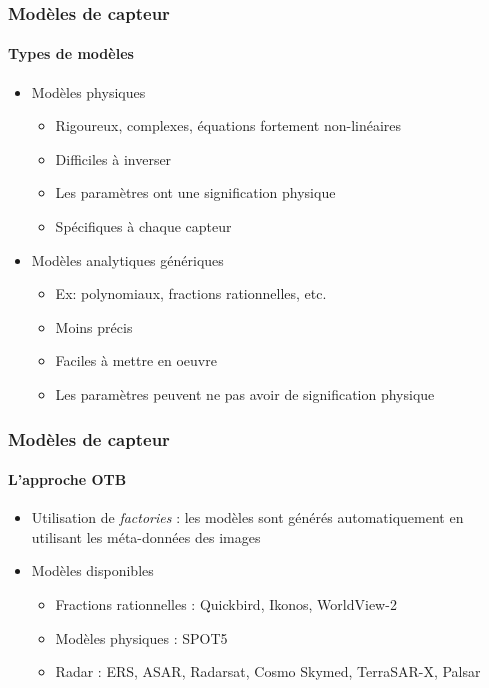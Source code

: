 \documentclass[compress,handout]{beamer}
\begin{document}
\begin{frame}
  \frametitle{Modèles de capteur}

  \framesubtitle{Types de modèles}
  \begin{itemize}
    \item Modèles physiques
      \begin{itemize}
	\item Rigoureux, complexes, équations fortement non-linéaires
	\item Difficiles à inverser
	\item Les paramètres ont une signification physique
	\item Spécifiques à chaque capteur
      \end{itemize}
    \item Modèles analytiques génériques
      \begin{itemize}
	\item Ex: polynomiaux, fractions rationnelles, etc.
	\item Moins précis
	\item Faciles à mettre en oeuvre
	\item Les paramètres peuvent ne pas avoir de signification physique
      \end{itemize}
  \end{itemize}

\end{frame}

\begin{frame}
  \frametitle{Modèles de capteur}

  \framesubtitle{L'approche OTB}
  \begin{itemize}
    \item Utilisation de {\em factories} : les modèles sont générés
      automatiquement en utilisant les méta-données des images
    \item Modèles disponibles
      \begin{itemize}
	\item Fractions rationnelles : Quickbird, Ikonos, WorldView-2
	\item Modèles physiques : SPOT5
	\item Radar : ERS, ASAR, Radarsat, Cosmo Skymed, TerraSAR-X, Palsar
      \end{itemize}
  \end{itemize}
\end{frame}
\end{document}
